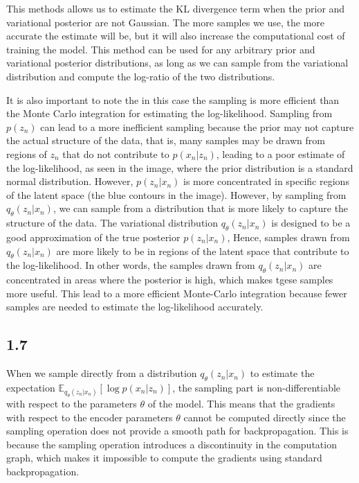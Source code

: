 \documentclass{article}
\begin{document}
This methods allows us to estimate the KL divergence term when the prior and variational posterior are not Gaussian. The more
samples we use, the more accurate the estimate will be, but it will also increase the computational cost of training the model.
This method can be used for any arbitrary prior and variational posterior distributions, as long as we can sample from the variational distribution
and compute the log-ratio of the two distributions.

It is also important to note the in this case the sampling is more efficient than the Monte Carlo integration for estimating the log-likelihood.
Sampling from $p(z_n)$ can lead to a more inefficient sampling because the prior may not capture the actual structure of the data, 
that is, many samples may be drawn from regions of $z_n$ that do not contribute to $p(x_n | z_n)$, leading to a poor estimate of the log-likelihood,
as seen in the image, where the prior distribution is a standard normal distribution. However, $p(z_n | x_n)$ is more concentrated
in specific regions of the latent space (the blue contours in the image).
However, by sampling from $q_{\theta}(z_n|x_n)$, we can sample from a distribution that is more likely to capture the structure of the data.
The variational distribution $q_{\theta}(z_n|x_n)$ is designed to be a good approximation of the true posterior $p(z_n|x_n)$,
Hence, samples drawn from $q_{\theta}(z_n|x_n)$ are more likely to be in regions of the latent space that contribute to the log-likelihood. 
In other words, the samples drawn from $q_{\theta}(z_n|x_n)$ are concentrated in areas where the posterior is high, which makes tgese
samples more useful. This lead to a more efficient Monte-Carlo integration because fewer samples are needed to estimate the
log-likelihood accurately.

\subsection*{1.7}

When we sample directly from a distribution $q_{\theta}(z_n|x_n)$ to estimate the expectation $\mathbb{E}_{q_{\theta}(z_n|x_n)}[\log p(x_n|z_n)]$,
the sampling part is non-differentiable with respect to the parameters $\theta$ of the model. This means that
the gradients with respect to the encoder parameters $\theta$ cannot be computed directly since the sampling operation does
not provide a smooth path for backpropagation. This is because the sampling operation introduces a discontinuity in the
computation graph, which makes it impossible to compute the gradients using standard backpropagation.
\end{document}
